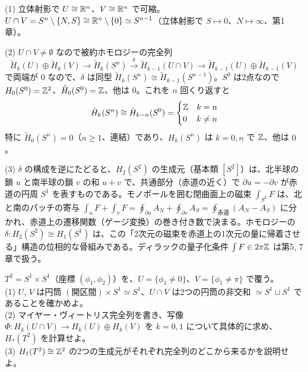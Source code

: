 \begin{solution}
(1) 立体射影で $U\cong\mathbb{R}^n$、$V\cong\mathbb{R}^n$ で可縮。$U\cap V=S^n\setminus\{N,S\}\cong\mathbb{R}^n\setminus\{0\}\simeq S^{n-1}$（立体射影で $S\mapsto0$、$N\mapsto\infty$、第1章）。

(2) $U\cap V\ne\emptyset$ なので被約ホモロジーの完全列
\[
\tilde H_k(U)\oplus\tilde H_k(V)\to\tilde H_k(S^n)\xrightarrow{\ \delta\ }\tilde H_{k-1}(U\cap V)\to\tilde H_{k-1}(U)\oplus\tilde H_{k-1}(V)
\]
で両端が $0$ なので、$\delta$ は同型 $\tilde H_k(S^n)\cong\tilde H_{k-1}(S^{n-1})$。$S^0$ は2点なので $H_0(S^0)=\mathbb{Z}^2$、$\tilde H_0(S^0)=\mathbb{Z}$、他は $0$。これを $n$ 回くり返すと
\[
\tilde H_k(S^n)\cong\tilde H_{k-n}(S^0)=\begin{cases}\mathbb{Z}&k=n\\0&k\neq n\end{cases}
\]
特に $\tilde H_0(S^n)=0$（$n\ge1$、連結）であり、$H_k(S^n)$ は $k=0,n$ で $\mathbb{Z}$、他は $0$。

(3) $\delta$ の構成を逆にたどると、$H_2(S^2)$ の生成元（基本類 $[S^2]$）は、北半球の鎖 $u$ と南半球の鎖 $v$ の和 $u+v$ で、共通部分（赤道の近く）で $\partial u=-\partial v$ が赤道の円周 $S^1$ を表すものである。モノポールを囲む閉曲面上の磁束 $\int_{S^2}F$ は、北と南のパッチの寄与 $\int_uF+\int_vF=\oint_{\partial u}A_N+\oint_{\partial v}A_S=\oint_{\text{赤道}}(A_N-A_S)$ に分かれ、赤道上の遷移関数（ゲージ変換）の巻き付き数で決まる。ホモロジーの $\delta\colon H_2(S^2)\cong H_1(S^1)$ は、この「2次元の磁束を赤道上の1次元の量に帰着させる」構造の位相的な骨組みである。ディラックの量子化条件 $\int F\in2\pi\mathbb{Z}$ は第5, 7章で扱う。
\end{solution}

\begin{problem}[難易度 C]\label{ch04-prob-mvtorus}
$T^2=S^1\times S^1$（座標 $(\phi_1,\phi_2)$）を、$U=\{\phi_1\ne0\}$、$V=\{\phi_1\ne\pi\}$ で覆う。\\
(1) $U$, $V$ は円筒 $(\text{開区間})\times S^1\simeq S^1$、$U\cap V$ は2つの円筒の非交和 $\simeq S^1\sqcup S^1$ であることを確かめよ。\\
(2) マイヤー・ヴィートリス完全列を書き、写像 $\Phi\colon H_k(U\cap V)\to H_k(U)\oplus H_k(V)$ を $k=0,1$ について具体的に求め、$H_*(T^2)$ を計算せよ。\\
(3) $H_1(T^2)\cong\mathbb{Z}^2$ の2つの生成元がそれぞれ完全列のどこから来るかを説明せよ。
\end{problem}

